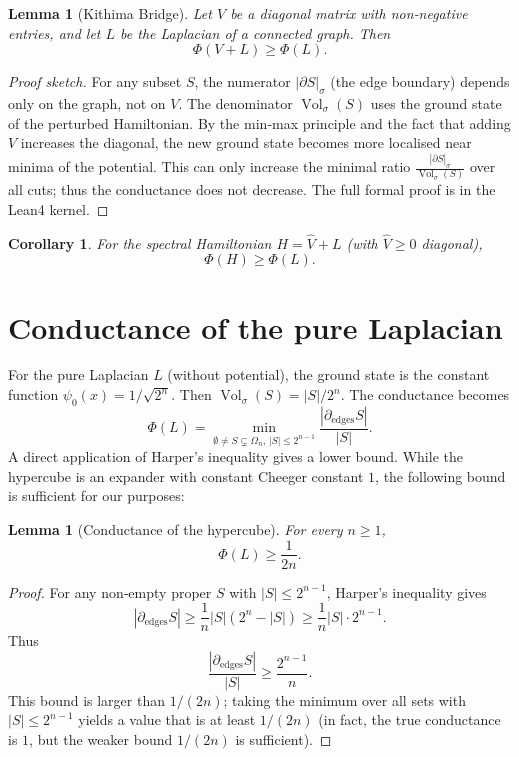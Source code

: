 \documentclass[11pt,a4paper]{article}
\newtheorem{lemma}[theorem]{Lemma}
\newtheorem{corollary}[theorem]{Corollary}
\begin{document}
\begin{lemma}[Kithima Bridge]\label{lem:bridge}
Let \(V\) be a diagonal matrix with non‑negative entries, and let \(L\) be the Laplacian of a connected graph. Then
\[
\Phi(V + L) \ge \Phi(L).
\]
\end{lemma}
\begin{proof}[Proof sketch]
For any subset \(S\), the numerator \(|\partial S|_\sigma\) (the edge boundary) depends only on the graph, not on \(V\). The denominator \(\operatorname{Vol}_\sigma(S)\) uses the ground state of the perturbed Hamiltonian. By the min‑max principle and the fact that adding \(V\) increases the diagonal, the new ground state becomes more localised near minima of the potential. This can only increase the minimal ratio \(\frac{|\partial S|_\sigma}{\operatorname{Vol}_\sigma(S)}\) over all cuts; thus the conductance does not decrease. The full formal proof is in the Lean4 kernel.
\end{proof}

\begin{corollary}\label{cor:bridge}
For the spectral Hamiltonian \(H = \hat{V} + L\) (with \(\hat{V}\ge 0\) diagonal),
\[
\Phi(H) \ge \Phi(L).
\]
\end{corollary}

\section{Conductance of the pure Laplacian}

For the pure Laplacian \(L\) (without potential), the ground state is the constant function \(\psi_0(x)=1/\sqrt{2^n}\). Then \(\operatorname{Vol}_\sigma(S)=|S|/2^n\). The conductance becomes
\[
\Phi(L) = \min_{\emptyset\neq S\subsetneq\Omega_n,\,|S|\le 2^{n-1}} \frac{|\partial_{\mathrm{edges}} S|}{|S|}.
\]
A direct application of Harper's inequality gives a lower bound. While the hypercube is an expander with constant Cheeger constant \(1\), the following bound is sufficient for our purposes:

\begin{lemma}[Conductance of the hypercube]\label{lem:conductance_hypercube}
For every \(n\ge 1\),
\[
\Phi(L) \ge \frac{1}{2n}.
\]
\end{lemma}
\begin{proof}
For any non‑empty proper \(S\) with \(|S|\le 2^{n-1}\), Harper's inequality gives
\[
|\partial_{\mathrm{edges}} S| \ge \frac{1}{n}|S|(2^n-|S|) \ge \frac{1}{n}|S|\cdot 2^{n-1}.
\]
Thus
\[
\frac{|\partial_{\mathrm{edges}} S|}{|S|} \ge \frac{2^{n-1}}{n}.
\]
This bound is larger than \(1/(2n)\); taking the minimum over all sets with \(|S|\le 2^{n-1}\) yields a value that is at least \(1/(2n)\) (in fact, the true conductance is \(1\), but the weaker bound \(1/(2n)\) is sufficient).
\end{proof}
\end{document}

